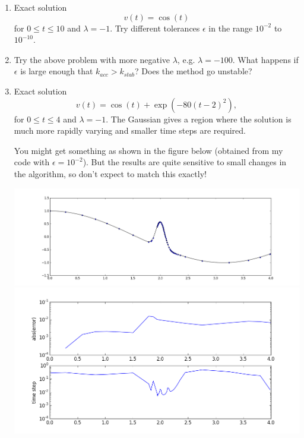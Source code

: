 \documentclass[10pt]{article}
\begin{document}
\begin{enumerate} 
\item  Exact solution
\[
v(t) = \cos(t) 
\]
for $0\leq t \leq 10$ and $\lambda = -1$. Try different tolerances
$\epsilon$ in the range $10^{-2}$ to $10^{-10}$.

\item
Try the above problem with more negative $\lambda$, e.g. $\lambda=-100$.
What happens if $\epsilon$ is large enough that $k_{acc} > k_{stab}$?  Does
the method go unstable?


\item  Exact solution
\[
v(t) = \cos(t) + \exp\left(-80(t-2)^2\right),
\]
for $0\leq t \leq 4$ and $\lambda = -1$. The Gaussian gives a region where the
solution is much more rapidly varying and smaller time steps are required. 

You might get something as shown in the figure below
(obtained from my code with $\epsilon = 10^{-2}$).   
But the results are quite sensitive to small changes in the algorithm, so
don't expect to match this exactly!

\vskip 5pt
\hfil\includegraphics[width=5.5in]{u.png}\hfil
\vskip 5pt
\hfil\includegraphics[width=5.5in]{errdt.png}\hfil
\vskip 5pt



\end{enumerate} 





\end{document}
